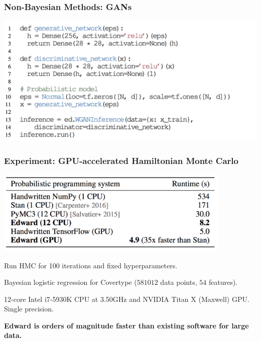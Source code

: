 \documentclass[10pt,
               xcolor={usenames,dvipsnames},
               hyperref={colorlinks,linktoc=all,citecolor=Plum,linkcolor=MidnightBlue,urlcolor=MidnightBlue},noamssymb]{beamer}
\begin{document}
\begin{frame}
\frametitle{Non-Bayesian Methods: GANs}
\begin{center}
\vspace{-2ex}
\includegraphics[width=1.1\textwidth]{img/ganw_example.png}
\end{center}
\end{frame}

\begin{frame}
\frametitle{Experiment: GPU-accelerated Hamiltonian Monte Carlo}
\begin{center}
\includegraphics[width=0.85\textwidth]{img/experiments_hmc.png}
\end{center}
\vspace{-1ex}
Run HMC for 100 iterations and fixed hyperparameters.

Bayesian logistic regression for Covertype ($581012$ data points, $54$
features).

12-core Intel i7-5930K CPU at 3.50GHz and NVIDIA Titan X (Maxwell) GPU.
Single precision.

\vspace{4ex}
\textbf{Edward is orders of magnitude faster than existing software
for large data.}
\end{frame}
\end{document}
